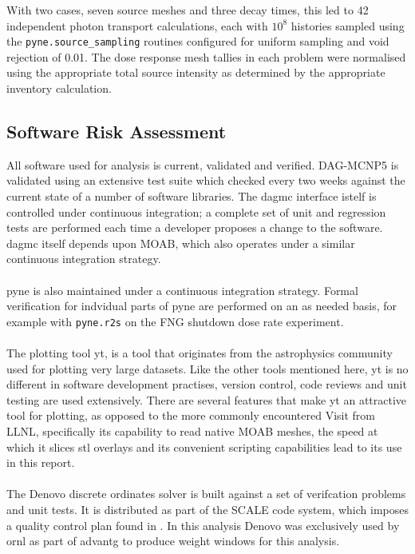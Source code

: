\documentclass[12pt]{article}
\begin{document}
With two cases, seven source meshes and three decay times, this led to 42
independent photon transport calculations, each with $10^8$ histories sampled
using the \texttt{pyne.source\_sampling} routines configured for uniform
sampling and void rejection of 0.01.  The dose response mesh tallies in each
problem were normalised using the appropriate total source intensity as determined
by the appropriate inventory calculation.

\subsection{Software Risk Assessment}
All software used for analysis is current, validated and verified. DAG-MCNP5
is validated using an extensive test suite which checked every two weeks against
the current state of a number of software libraries.  The \gls{dagmc} interface
istelf is controlled under continuous integration; a complete set of unit and
regression tests are performed each time a developer proposes a change to the
software.  \gls{dagmc} itself depends upon MOAB, which also operates under a
similar continuous integration strategy.
\\
\\
\gls{pyne} is also maintained under a continuous integration strategy.  
Formal verification for indvidual parts of \gls{pyne} are performed on an as
needed basis, for example with \texttt{pyne.r2s} on the FNG shutdown dose rate
experiment. \cite{biondoFED2016}
\\
\\
The plotting tool yt, is a tool that originates from the astrophysics community used
for plotting very large datasets. Like the other tools mentioned here, yt is no different
in software development practises, version control, code reviews and unit testing are
used extensively. There are several features that make yt an attractive 
tool for plotting, as opposed to the more commonly encountered Visit from LLNL, specifically
its capability to read native MOAB meshes, the speed at which it slices stl overlays and 
its convenient scripting capabilities lead to its use in this report.
\\
\\
The Denovo discrete ordinates solver is built against a set of verifcation 
problems and unit tests. It is distributed as part of the SCALE code system, which imposes
a quality control plan found in \cite{scale_qa}. In this analysis Denovo was exclusively
used by \gls{ornl} as part of \gls{advantg} to produce weight windows for this analysis.
\end{document}
